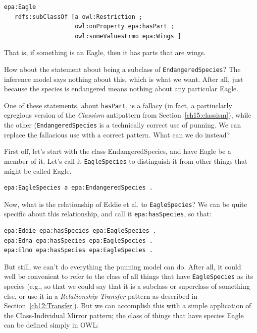 \begin{lstlisting}
epa:Eagle 
   rdfs:subClassOf [a owl:Restriction ;
                    owl:onProperty epa:hasPart ;
                    owl:someValuesFrmo epa:Wings ]
\end{lstlisting}

That is, if something is an Eagle, then it has parts that are wings. 

How about the statement about being a subclass of \texttt{EndangeredSpecies}?  
The inference model says nothing about this, which is what we want.  After all, 
just because the species is endangered means nothing about any particular 
Eagle.  

One of these statements, about \texttt{hasPart}, is a fallacy (in fact, a partiuclarly
egregious version 
of the \emph{Classism} antipattern from Section~\ref{ch15:classism}), 
while the other (\texttt{EndangeredSpecies}
is a technically correct use of punning.  We can replace the fallacious use with a 
correct pattern.  What can we do instead? 

First off, let's start with the class EndangeredSpecies, and have 
Eagle be a member of it.  Let's call it \texttt{EagleSpecies} to distinguish it from other 
things that might be called Eagle. 

\begin{lstlisting}
epa:EagleSpecies a epa:EndangeredSpecies .
\end{lstlisting}

Now, what is the relationship of Eddie et al. to \texttt{EagleSpecies}?  We can be
quite specific about this relationship, and call it \texttt{epa:hasSpecies}, so that:

\begin{lstlisting}
epa:Eddie epa:hasSpecies epa:EagleSpecies .
epa:Edna epa:hasSpecies epa:EagleSpecies .
epa:Elmo epa:hasSpecies epa:EagleSpecies . 
\end{lstlisting}

But still, we can't do everything the punning model can do.  After all, it 
could well be convenient to refer to the class of all things that have \texttt{EagleSpecies} 
as its species  (e.g., so that we could say that it is a subclass or superclass of
something else, or use it in a \emph{Relationship Transfer} pattern as described in 
Section~\ref{ch12:Transfer}).  But we can accomplish this with a simple application of the 
Class-Individual Mirror pattern;
the class of things that have species Eagle can be defined simply in OWL:

